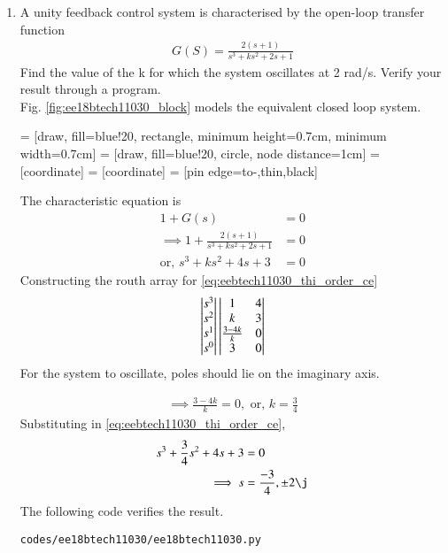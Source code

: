 \begin{enumerate}[label=\thesubsection.\arabic*.,ref=\thesubsection.\theenumi]
\item A unity feedback control system is characterised by the open-loop transfer function
\begin{align}
G(S) = \frac{2(s+1)}{s^3 + ks^2 + 2s +1}
\end{align}
Find the value of the k for which the system oscillates at 2 rad/s.  Verify your result through a program.\\
%
\solution Fig. \ref{fig:ee18btech11030_block} models the equivalent closed loop system. 

 = [draw, fill=blue!20, rectangle, 
    minimum height=0.7cm, minimum width=0.7cm]
 = [draw, fill=blue!20, circle, node distance=1cm]
 = [coordinate]
 = [coordinate]
 = [pin edge={to-,thin,black}]

\begin{figure}[!ht]
	\begin{center}
		
		\resizebox{\columnwidth}{!}{}
	\end{center}
\caption{}
\label{fig:ee18btech11030}
\end{figure}


%
The characteristic equation is
\begin{align}
1 + G(s) &= 0
\\
\implies 1 + \frac{2(s+1)}{s^3 + ks^2 + 2s +1} &= 0
\\
\text{or, } s^3+ks^2+4s+3 &= 0 
\label{eq:eebtech11030_thi_order_ce}
\end{align}
Constructing the routh array for \eqref{eq:eebtech11030_thi_order_ce}
\begin{align}
\begin{vmatrix}s^3\\s^2\\s^1 \\ s^0\end{vmatrix}
\begin{vmatrix}1 & 4 \\ k & 3 \\  \frac{3-4k}{k} & 0\\ 3 & 0\end{vmatrix} 
\end{align}
For the system to oscillate, poles should lie on the imaginary axis. 

\begin{align}
\implies \frac{3-4k}{k} = 0, \text{ or, }  k = \frac{3}{4}
\end{align}
Substituting in \eqref{eq:eebtech11030_thi_order_ce},
\begin{align} 
s^3+\frac{3}{4}s^2+4s+3 &= 0
\\
\implies  s &= \frac{-3}{4},\pm 2\j
\end{align}
%
The following code verifies the result.
\begin{lstlisting}
codes/ee18btech11030/ee18btech11030.py
\end{lstlisting}


\end{enumerate}
